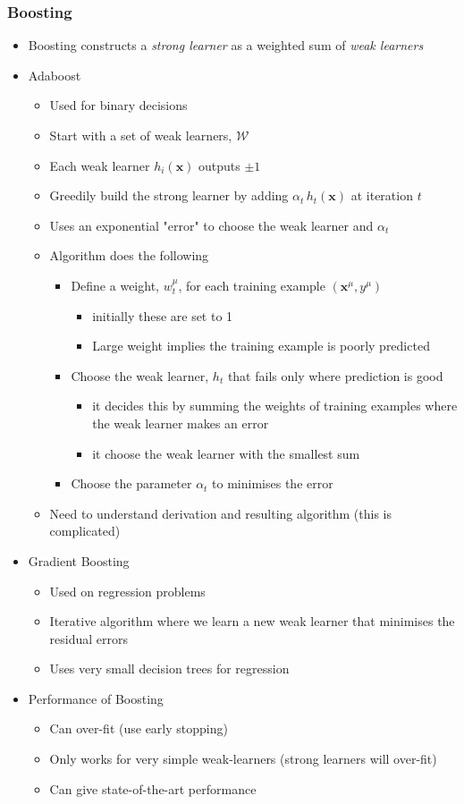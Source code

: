\documentclass[11pt]{article}
\begin{document}
\subsubsection{Boosting}
\label{sec:orga5f2f35}
\begin{itemize}
\item Boosting constructs a \emph{strong learner} as a weighted sum of \emph{weak learners}
\item Adaboost
\begin{itemize}
\item Used for binary decisions
\item Start with a set of weak learners, \(\mathcal{W}\)
\item Each weak learner \(h_i(\bm{x})\) outputs \(\pm1\)
\item Greedily build the strong learner by adding \(\alpha_t\,
        h_t(\bm{x})\) at iteration \(t\)
\item Uses an exponential "error" to choose the weak learner and \(\alpha_t\)
\item Algorithm does the following
\begin{itemize}
\item Define a weight, \(w_t^\mu\), for each training example
\((\bm{x}^\mu,y^\mu)\)
\begin{itemize}
\item initially these are set to 1
\item Large weight implies the training example is poorly predicted
\end{itemize}
\item Choose the weak learner, \(h_t\) that fails only where prediction is good
\begin{itemize}
\item it decides this by summing the weights of training
examples where the weak learner makes an error
\item it choose the weak learner with the smallest sum
\end{itemize}
\item Choose the parameter \(\alpha_t\) to minimises the error
\end{itemize}
\item Need to understand derivation and resulting algorithm (this is
complicated)
\end{itemize}
\item Gradient Boosting
\begin{itemize}
\item Used on regression problems
\item Iterative algorithm where we learn a new weak learner that
minimises the residual errors
\item Uses very small decision trees for regression
\end{itemize}
\item Performance of Boosting
\begin{itemize}
\item Can over-fit (use early stopping)
\item Only works for very simple weak-learners (strong learners will
over-fit)
\item Can give state-of-the-art performance
\end{itemize}
\end{itemize}
\end{document}
